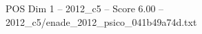 \begin{textsample}{POS Dim 1 – 2012\_c5 – Score 6.00 – 2012\_c5/enade\_2012\_psico\_041b49a74d.txt}
\end{textsample}

